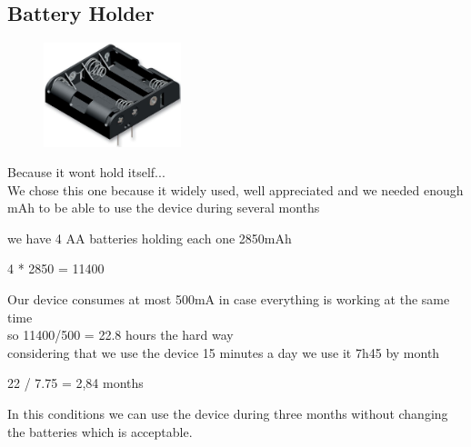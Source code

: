 \documentclass[12pt,a4paper,landscape]{article}
\begin{document}
\begin{multicols}{2}
			\vspace{4cm}
	\subsection*{Battery Holder}
			\begin{figure}[H]
			\centering
			\includegraphics[width=4cm]{images/battery_holder.png} 
			\end{figure}
			Because it wont hold itself...\\
			We chose this one because it widely used, well appreciated and we needed enough mAh to be able to use the device during several months 

			we have 4 AA batteries holding each one 2850mAh 

			4 * 2850 = 11400 

			Our device consumes at most 500mA in case everything is working at the same time\\

			so 11400/500 = 22.8 hours the hard way\\

			considering that we use the device 15 minutes a day we use it 7h45 by month 

			 22 / 7.75 = 2,84 months 

			In this conditions we can use the device during three months without changing the batteries which is acceptable.
	\end{multicols}

	\vspace{3cm}

\newpage
{}
\end{document}
